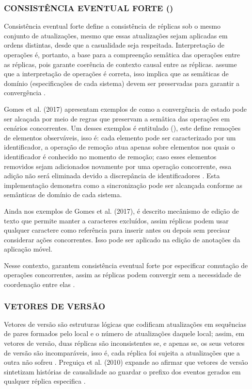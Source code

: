 \subsubsection{CONSISTÊNCIA EVENTUAL FORTE ()}

Consistência eventual forte define a consistência de réplicas sob o mesmo conjunto de atualizações, mesmo que essas atualizações sejam aplicadas em ordens distintas, desde que a casualidade seja respeitada. Interpretação de operações é, portanto, a base para a compreenção semâtica das operações entre as réplicas, pois garante coerência de contexto causal entre as réplicas.  assume que a interpretação de operações é correta, isso implica que as semâticas de domínio (especificações de cada sistema) devem ser preservadas para garantir a convergência \cite{Gomes2017VerifyingSEC}.

Gomes et al. (2017) apresentam exemplos de como a convergência de estado pode ser alcaçada por meio de regras que preservam a semâtica das operações em cenários concorrentes. Um desses exemplos é entitulado  (), este define remoções de elementos observáveis, isso é: cada elemento pode ser caracterizado por um identificador, a operação de remoção atua apenas sobre elementos nos quais o identificador é conhecido no momento de remoção; caso esses elementos removidos sejam adicionados novamente por uma operação concorrente, essa adição não será eliminada devido a discrepância de identificadores \cite{Gomes2017VerifyingSEC}. Esta implementação demonstra como a sincronização pode ser alcançada conforme as semânticas de domínio de cada sistema.

Ainda nos exemplos de Gomes et al. (2017), é descrito mecânismo de edição de texto que permite manter a caracteres excluídos, assim réplicas podem usar qualquer caractere como referência para inserir antes ou depois sem precisar considerar ações concorrentes. Isso pode ser aplicado na edição de anotações da aplicação móvel.

Nesse contexto,  garantem consistência eventual forte por especificar comutação de operações concorrentes, assim as réplicas podem convergir sem a necessidade de coordenação entre elas \cite{Shapiro2015CRDT}. 

\subsubsection{VETORES DE VERSÃO}

Vetores de versão são estruturas lógicas que codificam atualizações em sequências de pares formados pelo local e o número de atualizações daquele local; assim, em vetores de versão, duas réplicas são inconsistentes se, e apenas se, os seus vetores de versão são incomparáveis, isso é, cada réplica foi sujeita a atualizações que a outra não sofreu \cite{parker1983detection}.  Preguiça et al. (2010) expande ao afirmar que vetores de versão sintetizam histórias de causalidade ao guardar o prefixo dos eventos gerados em qualquer réplica especifica \cite{preguica2010dotted}.

